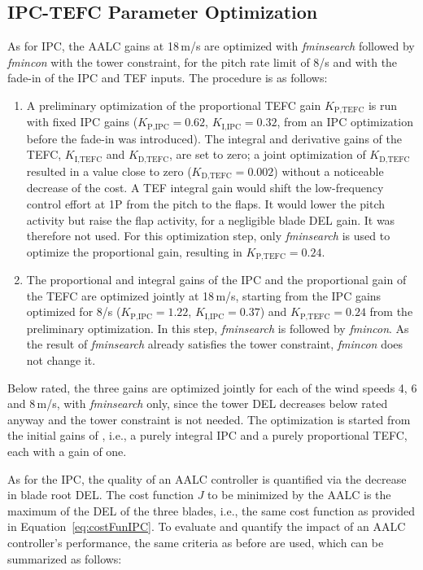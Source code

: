\subsection{IPC-TEFC Parameter Optimization} \label{sec:ControllerParameterOptimization}
As for IPC, the AALC gains at 18\,m/s are optimized with \textit{fminsearch} followed by \textit{fmincon} with the tower constraint, for the pitch rate limit of 8\textdegree/s and with the fade-in of the IPC and TEF inputs. The procedure is as follows:
\begin{enumerate}
    \item A preliminary optimization of the proportional TEFC gain $K_{\text{P,TEFC}}$ is run with fixed IPC gains ($K_{\text{P,IPC}} = 0.62$, $K_{\text{I,IPC}} = 0.32$, from an IPC optimization before the fade-in was introduced). The integral and derivative gains of the TEFC, $K_{\text{I,TEFC}}$ and $K_{\text{D,TEFC}}$, are set to zero; a joint optimization of $K_{\text{D,TEFC}}$ resulted in a value close to zero ($K_{\text{D,TEFC}} = 0.002$) without a noticeable decrease of the cost. A TEF integral gain would shift the low-frequency control effort at 1P from the pitch to the flaps. It would lower the pitch activity but raise the flap activity, for a negligible blade DEL gain. It was therefore not used. For this optimization step, only \textit{fminsearch} is used to optimize the proportional gain, resulting in $K_{\text{P,TEFC}} = 0.24$.
    \item The proportional and integral gains of the IPC and the proportional gain of the TEFC are optimized jointly at 18\,m/s, starting from the IPC gains optimized for 8\textdegree/s ($K_{\text{P,IPC}} = 1.22$, $K_{\text{I,IPC}} = 0.37$) and $K_{\text{P,TEFC}} = 0.24$ from the preliminary optimization. In this step, \textit{fminsearch} is followed by \textit{fmincon}. As the result of \textit{fminsearch} already satisfies the tower constraint, \textit{fmincon} does not change it.
\end{enumerate}
Below rated, the three gains are optimized jointly for each of the wind speeds 4, 6 and 8\,m/s, with \textit{fminsearch} only, since the tower DEL decreases below rated anyway and the tower constraint is not needed. The optimization is started from the initial gains of \cite{dittmer2024combined}, i.e., a purely integral IPC and a purely proportional TEFC, each with a gain of one.


As for the IPC, the quality of an AALC controller is quantified via the decrease in blade root DEL. The cost function $J$ to be minimized by the AALC is the maximum of the DEL of the three blades, i.e., the same cost function as provided in Equation~\eqref{eq:costFunIPC}.
To evaluate and quantify the impact of an AALC controller's performance, the same criteria as before are used, which can be summarized as follows:

